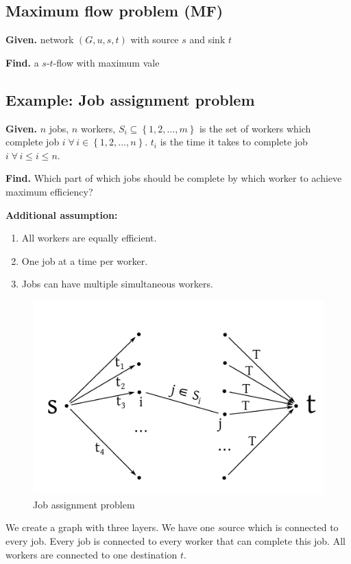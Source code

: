 \documentclass{article}
\newcommand{\set}[1]{\left\{#1\right\}}
\newcommand{\given}[1]{\textbf{Given.} #1\par}
\newcommand{\find}[1]{\textbf{Find.} #1\par}
\newcommand{\flow}[2]{$#1$-$#2$-flow}
\newcommand{\fall}{\;\forall\,}
\begin{document}
\subsection{Maximum flow problem (MF)}
%
\given{network $(G, u, s, t)$ with source $s$ and sink $t$}
\find{a \flow st with maximum vale}

\subsection{Example: Job assignment problem}
%
\given{$n$ jobs, $n$ workers, $S_i \subseteq \set{1, 2, \ldots, m}$ is the set of workers which complete job $i \fall i \in \set{1, 2, \ldots, n}$. $t_i$ is the time it takes to complete job $i \fall i \leq i \leq n$. }
\find{Which part of which jobs should be complete by which worker to achieve maximum efficiency?}

\textbf{Additional assumption:}
\begin{enumerate}
  \item All workers are equally efficient.
  \item One job at a time per worker.
  \item Jobs can have multiple simultaneous workers.
\end{enumerate}

 \begin{figure}[ht]
  \begin{center}
   \includegraphics{img/max_flow_jobs.pdf}
   \caption{Job assignment problem}
  \end{center}
 \end{figure}

We create a graph with three layers. We have one $s$ource which is connected to every job. Every job is connected to every worker that can complete this job. All workers are connected to one destination $t$.
\end{document}
